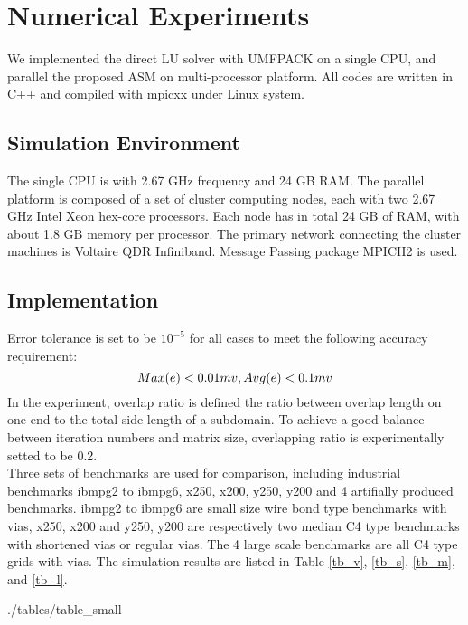 \documentclass{sig-alternate}
\begin{document}
\section{Numerical Experiments}
	We implemented the direct LU solver with UMFPACK on a single CPU, and parallel the proposed ASM on multi-processor platform. 
	All codes are written in C++ and compiled with mpicxx under Linux system. 
  \subsection{Simulation Environment}
	The single CPU is with 2.67 GHz frequency and 24 GB RAM. The parallel platform is composed of a set of cluster 
	computing nodes, each with two 2.67 GHz Intel Xeon hex-core processors. Each node has in total 24 GB of RAM, with about 
	1.8 GB memory per processor. The primary network connecting the cluster machines is Voltaire QDR Infiniband. Message 
	Passing package MPICH2 is used.  
  \subsection{Implementation}
	Error tolerance is set to be $10^{-5}$ for all cases to meet the following accuracy requirement:
	\begin{equation}
		Max(e) < 0.01 mv, Avg(e) < 0.1 mv\\ \label{eq_err}
	\end{equation}
	In the experiment, overlap ratio is defined the ratio between overlap length on one end to the total side length of a subdomain. 
	To achieve a good balance between iteration numbers and matrix size, overlapping ratio is experimentally 
	setted to be 0.2.\\
			
	Three sets of benchmarks are used for comparison, including 
	industrial benchmarks ibmpg2 to ibmpg6, x250, x200, y250, y200 and 4 artifially produced benchmarks. ibmpg2 to ibmpg6 are 
	small size wire bond type benchmarks with vias, x250, x200 and y250, y200 are respectively two median C4 type benchmarks with
	shortened vias or regular vias. The 4 large scale benchmarks are all C4 type grids with vias. The simulation results are 
	listed in Table \ref{tb_v}, \ref{tb_s}, \ref{tb_m}, and \ref{tb_l}.\\

	\begin{table}[h]
	   \label{tb_v}
  	   {./tables/table_small} \label{tb_s}
  	   \label{tb_m}
  	   \label{tb_l}
	\end{table}
	
\end{document}
